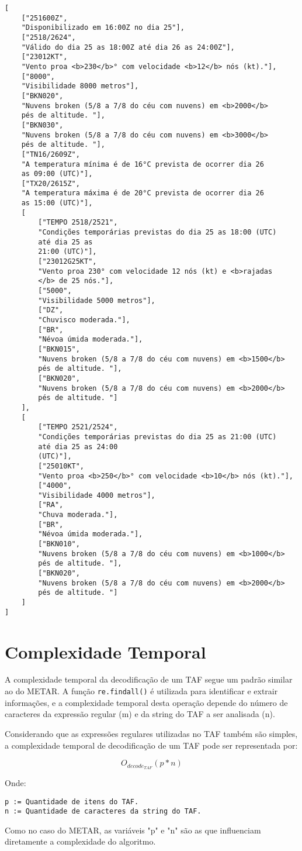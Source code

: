 \begin{verbatim}
[
    ["251600Z",
    "Disponibilizado em 16:00Z no dia 25"],
    ["2518/2624",
    "Válido do dia 25 as 18:00Z até dia 26 as 24:00Z"],
    ["23012KT",
    "Vento proa <b>230</b>° com velocidade <b>12</b> nós (kt)."],
    ["8000",
    "Visibilidade 8000 metros"],
    ["BKN020",
    "Nuvens broken (5/8 a 7/8 do céu com nuvens) em <b>2000</b> 
    pés de altitude. "],
    ["BKN030",
    "Nuvens broken (5/8 a 7/8 do céu com nuvens) em <b>3000</b> 
    pés de altitude. "],
    ["TN16/2609Z",
    "A temperatura mínima é de 16°C prevista de ocorrer dia 26 
    as 09:00 (UTC)"],
    ["TX20/2615Z",
    "A temperatura máxima é de 20°C prevista de ocorrer dia 26 
    as 15:00 (UTC)"],
    [
        ["TEMPO 2518/2521",
        "Condições temporárias previstas do dia 25 as 18:00 (UTC) 
        até dia 25 as 
        21:00 (UTC)"],
        ["23012G25KT",
        "Vento proa 230° com velocidade 12 nós (kt) e <b>rajadas
        </b> de 25 nós."],
        ["5000",
        "Visibilidade 5000 metros"],
        ["DZ",
        "Chuvisco moderada."],
        ["BR",
        "Névoa úmida moderada."],
        ["BKN015",
        "Nuvens broken (5/8 a 7/8 do céu com nuvens) em <b>1500</b> 
        pés de altitude. "],
        ["BKN020",
        "Nuvens broken (5/8 a 7/8 do céu com nuvens) em <b>2000</b> 
        pés de altitude. "]
    ],
    [
        ["TEMPO 2521/2524",
        "Condições temporárias previstas do dia 25 as 21:00 (UTC) 
        até dia 25 as 24:00 
        (UTC)"],
        ["25010KT",
        "Vento proa <b>250</b>° com velocidade <b>10</b> nós (kt)."],
        ["4000",
        "Visibilidade 4000 metros"],
        ["RA",
        "Chuva moderada."],
        ["BR",
        "Névoa úmida moderada."],
        ["BKN010",
        "Nuvens broken (5/8 a 7/8 do céu com nuvens) em <b>1000</b> 
        pés de altitude. "],
        ["BKN020",
        "Nuvens broken (5/8 a 7/8 do céu com nuvens) em <b>2000</b> 
        pés de altitude. "]
    ]
]
\end{verbatim}

\section{Complexidade Temporal}

A complexidade temporal da decodificação de um TAF segue um padrão similar ao do METAR.
A função \texttt{re.findall()} é utilizada para identificar e extrair informações, e a
complexidade temporal desta operação depende do número de caracteres da expressão regular
(m) e da string do TAF a ser analisada (n).

Considerando que as expressões regulares utilizadas no TAF também são simples, a complexidade
temporal de decodificação de um TAF pode ser representada por:

$$ O_{decode_{TAF}}(p * n)$$

Onde:

\begin{verbatim}
p := Quantidade de itens do TAF.
n := Quantidade de caracteres da string do TAF.
\end{verbatim}

Como no caso do METAR, as variáveis "p" e "n" são as que influenciam diretamente a
complexidade do algoritmo.